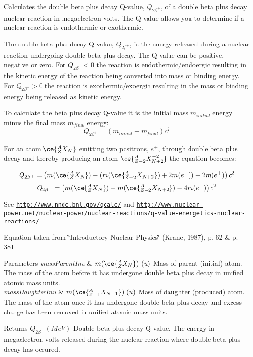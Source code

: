 Calculates the double beta plus decay Q-\/value, $Q_{2\beta^+}$, of a double beta plus decay nuclear reaction in megaelectron volts. The Q-\/value allows you to determine if a nuclear reaction is endothermic or exothermic. 

The double beta plus decay Q-\/value, $Q_{2\beta^+}$, is the energy released during a nuclear reaction undergoing double beta plus decay. The Q-\/value can be positive, negative or zero. For $Q_{2\beta^+} < 0$ the reaction is endothermic/endoergic resulting in the kinetic energy of the reaction being converted into mass or binding energy. For $Q_{2\beta^+} > 0$ the reaction is exothermic/exoergic resulting in the mass or binding energy being released as kinetic energy.

To calculate the beta plus decay Q-\/value it is the initial mass $m_{initial}$ energy minus the final mass $m_{final}$ energy\+: \[Q_{2\beta^+} = \left ( m_{initial}-m_{final}\right ) c^2\]

For an atom $\ce{ ^{A}_{Z}X_{N} }$ emitting two positrons, $e^+$, through double beta plus decay and thereby producing an atom $\ce{ ^{A}_{Z{-2}}X^{-2}_{N{+2}} }$ the equation becomes\+:

\[Q_{2\beta^+} = \left ( m(\ce{ ^{A}_{Z}X_{N} }) - (m(\ce{ ^{A}_{Z{-2}}X_{N{+2}} }) + 2m(e^+)) - 2m(e^+)\right ) c^2\] \[Q_{2\beta^+} = \left ( m(\ce{ ^{A}_{Z}X_{N} }) - m(\ce{ ^{A}_{Z{-2}}X_{N{+2}} }) - 4m(e^+)\right ) c^2\]

See \href{http://www.nndc.bnl.gov/qcalc/}{\tt http\+://www.\+nndc.\+bnl.\+gov/qcalc/} and \href{http://www.nuclear-power.net/nuclear-power/nuclear-reactions/q-value-energetics-nuclear-reactions/}{\tt http\+://www.\+nuclear-\/power.\+net/nuclear-\/power/nuclear-\/reactions/q-\/value-\/energetics-\/nuclear-\/reactions/}

Equation taken from \char`\"{}\+Introductory Nuclear Physics\char`\"{} (Krane, 1987), p. 62 \& p. 381


\begin{DoxyParams}{Parameters}
{\em mass\+Parent\+Inu} & $m(\ce{ ^{A}_{Z}X_{N} })\ (u)$ Mass of parent (initial) atom. The mass of the atom before it has undergone double beta plus decay in unified atomic mass units. \\
\hline
{\em mass\+Daughter\+Inu} & $m(\ce{ ^{A}_{Z{-1}}X_{N{+1}} })\ (u)$ Mass of daughter (produced) atom. The mass of the atom once it has undergone double beta plus decay and excess charge has been removed in unified atomic mass units. \\
\hline
\end{DoxyParams}
\begin{DoxyReturn}{Returns}
$Q_{2\beta^+}\ (MeV)$ Double beta plus decay Q-\/value. The energy in megaelectron volts released during the nuclear reaction where double beta plus decay has occured. 
\end{DoxyReturn}
\mbox{\label{group___q_value_gae25e179b76580bc6af7fa4bdf938ba4e}} 

